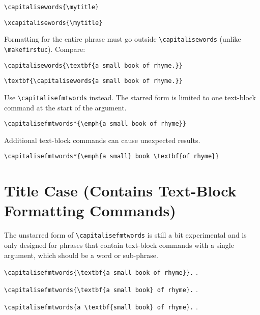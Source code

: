 \documentclass{article}
\begin{document}
\verb|\capitalisewords{\mytitle}|
\capitalisewords{\mytitle}

\verb|\xcapitalisewords{\mytitle}|
\xcapitalisewords{\mytitle}

\egroup

Formatting for the entire phrase must go outside
\verb|\capitalisewords| (unlike \verb|\makefirstuc|). Compare:

\begin{verbatim}
\capitalisewords{\textbf{a small book of rhyme.}}
\end{verbatim}

\begin{verbatim}
\textbf{\capitalisewords{a small book of rhyme.}}
\end{verbatim}
\textbf{}

\medskip

Use \verb|\capitalisefmtwords| instead. The starred form
is limited to one text-block command at the start of the argument.

\begin{verbatim}
\capitalisefmtwords*{\emph{a small book of rhyme}}
\end{verbatim}

Additional text-block commands can cause unexpected results.

\begin{verbatim}
\capitalisefmtwords*{\emph{a small} book \textbf{of rhyme}}
\end{verbatim}

\section{Title Case (Contains Text-Block Formatting Commands)}

The unstarred form of \verb|\capitalisefmtwords| is still a bit
experimental and is only designed
for phrases that contain text-block commands with a single
argument, which should be a word or sub-phrase.

\verb|\capitalisefmtwords{\textbf{a small book of rhyme}}.|
.

\verb|\capitalisefmtwords{\textbf{a small book} of rhyme}.|
.

\verb|\capitalisefmtwords{a \textbf{small book} of rhyme}.|
.
\end{document}
